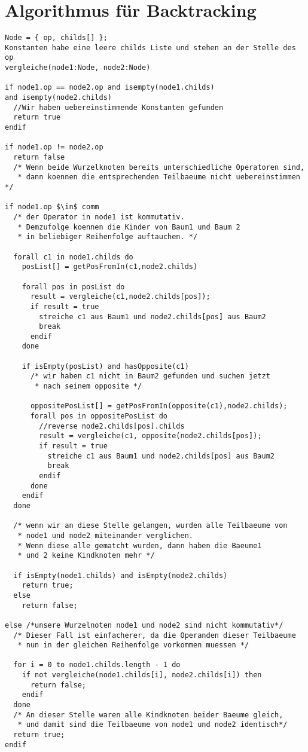  \section{Algorithmus für Backtracking}
 \label{sec:backtrack1}
 
\begin{lstlisting}[mathescape]
Node = { op, childs[] };
Konstanten habe eine leere childs Liste und stehen an der Stelle des op
vergleiche(node1:Node, node2:Node)

if node1.op == node2.op and isempty(node1.childs) 
and isempty(node2.childs)
  //Wir haben uebereinstimmende Konstanten gefunden
  return true
endif

if node1.op != node2.op 
  return false
  /* Wenn beide Wurzelknoten bereits unterschiedliche Operatoren sind,
   * dann koennen die entsprechenden Teilbaeume nicht uebereinstimmen */
	 
if node1.op $\in$ comm 
  /* der Operator in node1 ist kommutativ.
   * Demzufolge koennen die Kinder von Baum1 und Baum 2
   * in beliebiger Reihenfolge auftauchen. */
	 
  forall c1 in node1.childs do
    posList[] = getPosFromIn(c1,node2.childs)
	 
    forall pos in posList do
	  result = vergleiche(c1,node2.childs[pos]);
	  if result = true 
	    streiche c1 aus Baum1 und node2.childs[pos] aus Baum2
		break
	  endif	 	
	done
		 
    if isEmpty(posList) and hasOpposite(c1) 
      /* wir haben c1 nicht in Baum2 gefunden und suchen jetzt
       * nach seinem opposite */
		  
      oppositePosList[] = getPosFromIn(opposite(c1),node2.childs);
      forall pos in oppositePosList do
	    //reverse node2.childs[pos].childs
		result = vergleiche(c1, opposite(node2.childs[pos]);
		if result = true
		  streiche c1 aus Baum1 und node2.childs[pos] aus Baum2
	      break
	    endif
	  done
	endif
  done
	
  /* wenn wir an diese Stelle gelangen, wurden alle Teilbaeume von 
   * node1 und node2 miteinander verglichen. 
   * Wenn diese alle gematcht wurden, dann haben die Baeume1 
   * und 2 keine Kindknoten mehr */
	 
  if isEmpty(node1.childs) and isEmpty(node2.childs)
    return true;
  else
    return false;

else /*unsere Wurzelnoten node1 und node2 sind nicht kommutativ*/
  /* Dieser Fall ist einfacherer, da die Operanden dieser Teilbaeume 
   * nun in der gleichen Reihenfolge vorkommen muessen */
	 
  for i = 0 to node1.childs.length - 1 do
    if not vergleiche(node1.childs[i], node2.childs[i]) then
	  return false;
    endif
  done
  /* An dieser Stelle waren alle Kindknoten beider Baeume gleich, 
   * und damit sind die Teilbaeume von node1 und node2 identisch*/
  return true;
endif
	
\end{lstlisting}